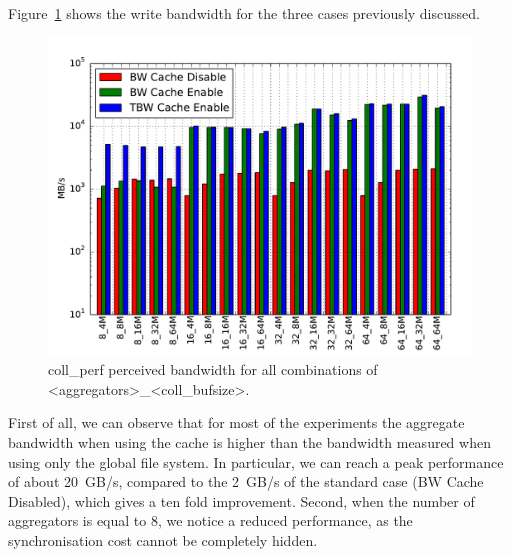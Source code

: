 Figure~\ref{figure: collperf-bw} shows the write bandwidth for the three cases previously discussed.
\begin{figure}[b!]
  \centering
  \includegraphics[width=0.95\columnwidth]{chapters/chapter3/figures/coll_perf_32GB_30sec_bw}
  \caption{coll\_perf perceived bandwidth for all combinations of <aggregators>\_<coll\_bufsize>.} %
  \label{figure: collperf-bw}
\end{figure}
First of all, we can observe that for most of the experiments the aggregate bandwidth when using the cache is higher than the bandwidth measured when using only the global file system. In particular, we can reach a peak performance of about 20~GB/s, compared to the 2~GB/s of the standard case (BW Cache Disabled), which gives a ten fold improvement. Second, when the number of aggregators is equal to 8, we notice a reduced performance, as the synchronisation cost cannot be completely hidden.

